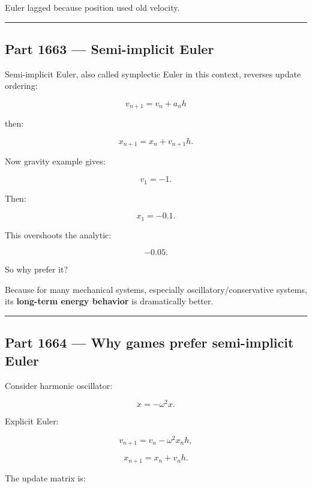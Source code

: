 Euler lagged because position used old velocity.

\begin{center}\rule{0.5\linewidth}{0.5pt}\end{center}

\subsection{Part 1663 --- Semi-implicit Euler}\label{06-engine-ii-ch037-part-1663-semi-implicit-euler}

\hypertarget{06-engine-ii-ch037-part-1663-semi-implicit-euler}{}

Semi-implicit Euler, also called symplectic Euler in this context, reverses update ordering:

\[
\boxed{
v_{n+1}
=
v_n+a_nh
}
\]

then:

\[
\boxed{
x_{n+1}
=
x_n+v_{n+1}h.
}
\]

Now gravity example gives:

\[
v_1=-1.
\]

Then:

\[
x_1=-0.1.
\]

This overshoots the analytic:

\[
-0.05.
\]

So why prefer it?

Because for many mechanical systems, especially oscillatory/conservative systems, its \textbf{long-term energy behavior} is dramatically better.

\begin{center}\rule{0.5\linewidth}{0.5pt}\end{center}

\subsection{Part 1664 --- Why games prefer semi-implicit Euler}\label{06-engine-ii-ch037-part-1664-why-games-prefer-semi-implicit-euler}

\hypertarget{06-engine-ii-ch037-part-1664-why-games-prefer-semi-implicit-euler}{}

Consider harmonic oscillator:

\[
\ddot x
=
-\omega^2x.
\]

Explicit Euler:

\[
v_{n+1}
=
v_n-\omega^2x_nh,
\]

\[
x_{n+1}
=
x_n+v_nh.
\]

The update matrix is:

